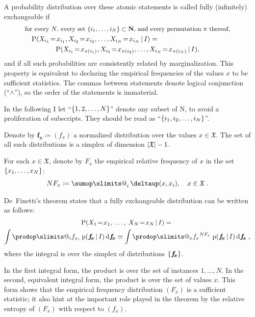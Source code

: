 \documentclass[\ifafour a4paper,12pt,\else a5paper,10pt,\fi%
onecolumn,oneside,article,%
british%
]{memoir}
\makeatletter
\theoremstyle{remark}
\theoremstyle{innote}
\def\sum{\DOTSI\sumop\slimits@}
\def\prod{\DOTSI\prodop\slimits@}
\newcommand*{\delt}{\deltaup}%
\newcommand*{\di}{\mathrm{d}}%
\newcommand*{\NN}{\bm{\mathrm{N}}}
\newcommand*{\defd}{\coloneqq}
\DeclarePairedDelimiter\abs{\lvert}{\rvert}
\DeclarePairedDelimiter\set{\{}{\}}
\newcommand*{\pf}{\mathrm{p}}%
\newcommand*{\p}{\mathrm{P}}%
\renewcommand*{\|}[1][]{\nonscript\,#1\vert\nonscript\,\mathopen{}}
\newcommand*{\tsum}{\mathop{\textstyle\sum}\nolimits}
\renewcommand*{\=}{\TextOrMath\texteq\eq}
\newcommand*{\X}[1]{X_{#1}}
\newcommand*{\x}[1]{x_{#1}}
\newcommand*{\sX}{\mathfrak{X}}
\newcommand*{\fx}{\bm{f_{\!x}}}
\makeatother
\begin{document}
A probability distribution over these atomic statements
is called fully (infinitely) exchangeable if
\begin{multline}
  \label{eq:exchangeable}
  \text{\small for every $N$, every set
    $\set{i_{1},\dotsc,i_{N}}\subset \NN$, and every permutation $\pi$ thereof,}
  \\
  \shoveleft{\p( \X{i_{1}}\=\x{i_{1}}, \X{i_{2}}\=\x{i_{2}},\dotsc,\X{i_{N}}\=\x{i_{N}}
    \| I) ={}}\\
  \p( \X{i_{1}}\=\x{\pi(i_{1})},
  \X{i_{2}}\=\x{\pi(i_{2})},\dotsc,\X{i_{N}}\=\x{\pi(i_{N})}   \| I),
\end{multline}
and if all such probabilities are consistently related by marginalization.
This property is equivalent to declaring the empirical frequencies of the
values $x$ to be sufficient statistics. The commas between statements
denote logical conjunction (\enquote{$\land$}), so the order of the
statements is immaterial.

In the following I let \enquote{$\set{1, 2, \dotsc, N}$} denote any subset
of $\NN$, to avoid a proliferation of subscripts. They should be read as
\enquote{$\set{i_{1}, i_{2}, \dotsc, i_{N}}$}.

Denote by $\fx \defd (f_{x})$ a normalized distribution over the values
$x \in \sX$. The set of all such distributions is a simplex of dimension
$\abs{\sX}-1$.

For each $x \in \sX$, denote by $F_{x}$ the empirical relative frequency of
$x$ in the set $\set{x_{1}, \dotsc, x_{N}}$:
\begin{equation}
  \label{eq:rel_frequencies}
  N F_{x} \defd \tsum_{i}\delt(x, \x{i}), \quad x \in \sX \;.
\end{equation}

De~Finetti's theorem states that a fully exchangeable distribution can be
written as follows:
\begin{multline}
  \label{eq:definetti_freq}
  \p( \X{1}\=\x{1},\; \dotsc, \; \X{N}\=\x{N} \| I) ={}\\
  \int \prod_{i} f_{\x{i}}\;  \pf(\fx \| I)\,\di\fx
\equiv  \int\prod_{x} {f_{x}}^{N F_{x}}\;   \pf(\fx \| I)\,\di\fx \;,
\end{multline}
where the integral is over the simplex of distributions $\set{\fx}$.

In the first integral form, the product is over the set of instances
$1,\dotsc,N$. In the second, equivalent integral form, the product is over
the set of values $x$. This form shows that the empirical frequency
distribution $(F_{x})$ is a sufficient statistic; it also hint at the
important role played in the theorem by the relative entropy of $(F_{x})$
with respect to $(f_{x})$.
\end{document}
